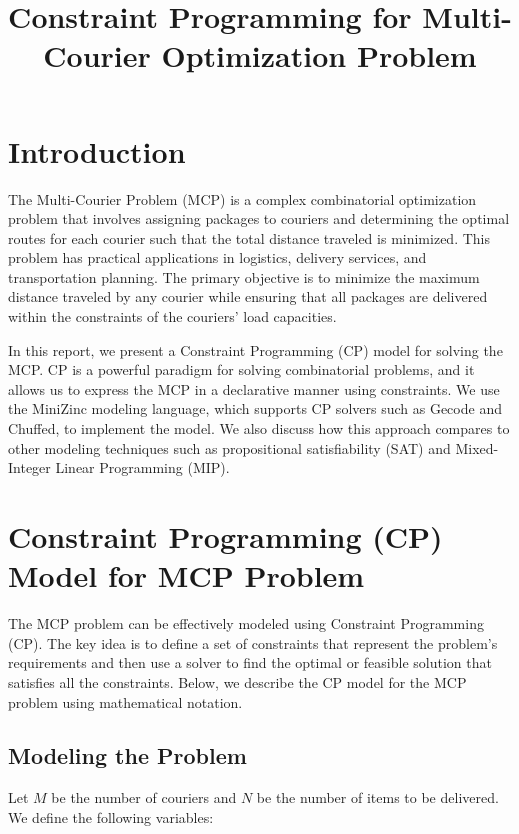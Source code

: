 \documentclass{article}
\title{Constraint Programming for Multi-Courier Optimization Problem}
\author{}
\date{}
\begin{document}
\maketitle

\section{Introduction}
The Multi-Courier Problem (MCP) is a complex combinatorial optimization problem that involves assigning packages to couriers and determining the optimal routes for each courier such that the total distance traveled is minimized. This problem has practical applications in logistics, delivery services, and transportation planning. The primary objective is to minimize the maximum distance traveled by any courier while ensuring that all packages are delivered within the constraints of the couriers' load capacities.

In this report, we present a Constraint Programming (CP) model for solving the MCP. CP is a powerful paradigm for solving combinatorial problems, and it allows us to express the MCP in a declarative manner using constraints. We use the MiniZinc modeling language, which supports CP solvers such as Gecode and Chuffed, to implement the model. We also discuss how this approach compares to other modeling techniques such as propositional satisfiability (SAT) and Mixed-Integer Linear Programming (MIP).

\section{Constraint Programming (CP) Model for MCP Problem}

The MCP problem can be effectively modeled using Constraint Programming (CP). The key idea is to define a set of constraints that represent the problem's requirements and then use a solver to find the optimal or feasible solution that satisfies all the constraints. Below, we describe the CP model for the MCP problem using mathematical notation.

\subsection{Modeling the Problem}

Let \( M \) be the number of couriers and \( N \) be the number of items to be delivered. We define the following variables:
\end{document}
